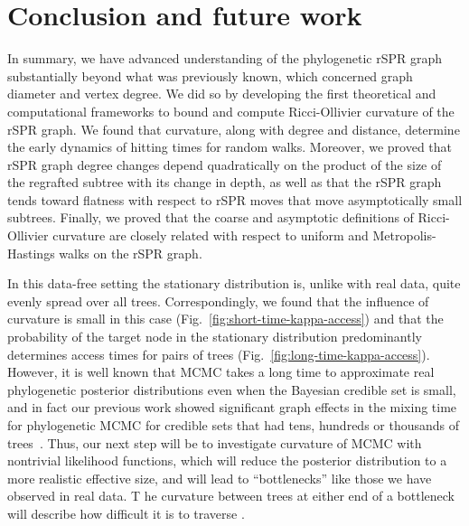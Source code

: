 \documentclass[11pt,onecolumn,conference]{IEEEtran}
\newcommand{\cuttable}[2][]{%
    \ifthenelse{\equal{#1}{}}%
		{}%
		{#1}%
}
\begin{document}
\section{Conclusion and future work}
In summary, we have advanced understanding of the phylogenetic rSPR graph substantially beyond what was previously known, which concerned graph diameter and vertex degree.
We did so by developing the first theoretical and computational frameworks to bound and compute Ricci-Ollivier curvature of the rSPR graph.
We found that curvature, along with degree and distance, determine the early dynamics of hitting times for random walks.
Moreover, we proved that rSPR graph degree changes depend quadratically on the product of the size of the regrafted subtree with its change in depth, as well as that the rSPR graph tends toward flatness with respect to rSPR moves that move asymptotically small subtrees.
Finally, we proved that the coarse and asymptotic definitions of Ricci-Ollivier curvature are closely related with respect to uniform and Metropolis-Hastings walks on the rSPR graph.

In this data-free setting the stationary distribution is, unlike with real data, quite evenly spread over all trees.
Correspondingly, we found that the influence of curvature is small in this case (Fig.~\ref{fig:short-time-kappa-access}) and that the probability of the target node in the stationary distribution predominantly determines access times for pairs of trees (Fig.~\ref{fig:long-time-kappa-access}).
However, it is well known that MCMC takes a long time to approximate real phylogenetic posterior distributions even when the Bayesian credible set is small, and in fact our previous work showed significant graph effects in the mixing time for phylogenetic MCMC for credible sets that had tens, hundreds or thousands of trees~\cite{Whidden2015-yi}.
Thus, our next step will be to investigate curvature of MCMC with nontrivial likelihood functions, which will \cuttable{significantly }reduce the posterior distribution to a more realistic effective size, and \cuttable{in certain cases }will lead to ``bottlenecks'' like those we have observed in real data.
\cuttable[T]{In those cases t}he curvature between \cuttable{two }trees at either end of a bottleneck will describe how difficult it is to traverse\cuttable{ the bottleneck}.
\cuttable{Indeed, in both the setting of challenging real data and in simulation with a nontrivial likelihood function, the stationary distribution takes a long time to achieve, and thus the curvature will have a substantially greater impact on the overall hitting times rather than being a short prelude to waiting for a Poisson process event as it is here (Fig.~\ref{fig:kappa-access}).}
\end{document}
